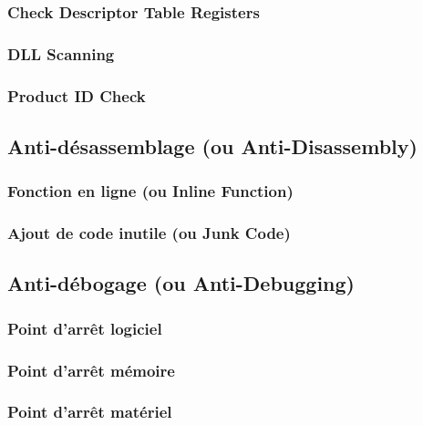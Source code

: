 \documentclass[10pt,a4paper]{article}
\begin{document}
\subsubsection{Check Descriptor Table Registers}                    
 
\subsubsection{DLL Scanning}                                        
 
\subsubsection{Product ID Check}                                    
 

\subsection{Anti-désassemblage (ou Anti-Disassembly)}
\subsubsection{Fonction en ligne (ou Inline Function)} 
 
\subsubsection{Ajout de code inutile (ou Junk Code)}   
 

\subsection{Anti-débogage (ou Anti-Debugging)}
\subsubsection{Point d'arrêt logiciel}                                   
 
\subsubsection{Point d'arrêt mémoire}                                    
 
\subsubsection{Point d'arrêt matériel}                                   
 
\end{document}
